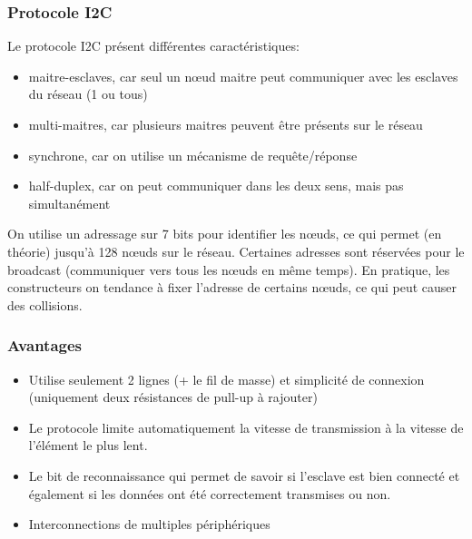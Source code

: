 \documentclass[french,a4paper,12pt]{report}
\begin{document}
  \subsubsection{Protocole I2C}
Le protocole I2C présent différentes caractéristiques:

\begin{itemize}
\item maitre-esclaves, car seul un nœud maitre peut communiquer avec les esclaves du réseau (1 ou tous)
\item multi-maitres, car plusieurs maitres peuvent être présents sur le réseau
\item synchrone, car on utilise un mécanisme de requête/réponse
\item half-duplex, car on peut communiquer dans les deux sens, mais pas simultanément
\end{itemize}

On utilise un adressage sur 7 bits pour identifier les nœuds, ce qui permet (en théorie) jusqu’à 128 nœuds sur le réseau. Certaines adresses sont réservées pour le broadcast (communiquer vers tous les nœuds en même temps). En pratique, les constructeurs on tendance à fixer l’adresse de certains nœuds, ce qui peut causer des collisions.


  \subsubsection{Avantages}
\begin{itemize}
\item Utilise seulement 2 lignes (+ le fil de masse) et simplicité de connexion (uniquement deux résistances de pull-up à rajouter)

\item Le protocole limite automatiquement la vitesse de transmission à la vitesse de l’élément le plus lent.

\item Le bit de reconnaissance qui permet de savoir si l’esclave est bien connecté et également si les données ont été correctement transmises ou non.

\item Interconnections de multiples périphériques
\end{itemize}
\end{document}
